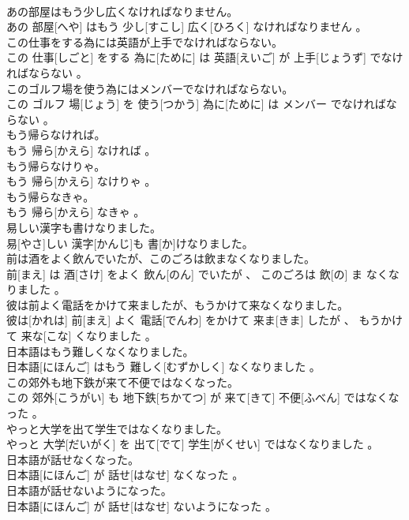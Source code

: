 \documentclass[8pt]{extreport}
\begin{document}
\begin{CJK}{UTF8}{min}
\\	あの部屋はもう少し広くなければなりません。	
\\	あの 部屋[へや] はもう 少し[すこし] 広く[ひろく] なければなりません 。
\\	この仕事をする為には英語が上手でなければならない。	
\\	この 仕事[しごと] をする 為に[ために] は 英語[えいご] が 上手[じょうず] でなければならない 。
\\	このゴルフ場を使う為にはメンバーでなければならない。	
\\	この ゴルフ 場[じょう] を 使う[つかう] 為に[ために] は メンバー でなければならない 。
\\	もう帰らなければ。	
\\	もう 帰ら[かえら] なければ 。
\\	もう帰らなけりゃ。	
\\	もう 帰ら[かえら] なけりゃ 。
\\	もう帰らなきゃ。	
\\	もう 帰ら[かえら] なきゃ 。
\\	易しい漢字も書けなりました。	
\\	易[やさ]しい 漢字[かんじ]も 書[か]けなりました。
\\	前は酒をよく飲んでいたが、このごろは飲まなくなりました。	
\\	前[まえ] は 酒[さけ] をよく 飲ん[のん] でいたが 、 このごろは 飲[の] ま なくなりました 。
\\	彼は前よく電話をかけて来ましたが、もうかけて来なくなりました。	
\\	彼は[かれは] 前[まえ] よく 電話[でんわ] をかけて 来ま[きま] したが 、 もうかけて 来な[こな] くなりました 。
\\	日本語はもう難しくなくなりました。	
\\	日本語[にほんご] はもう 難しく[むずかしく] なくなりました 。
\\	この郊外も地下鉄が来て不便ではなくなった。	
\\	この 郊外[こうがい] も 地下鉄[ちかてつ] が 来て[きて] 不便[ふべん] ではなくなった 。
\\	やっと大学を出て学生ではなくなりました。	
\\	やっと 大学[だいがく] を 出て[でて] 学生[がくせい] ではなくなりました 。
\\	日本語が話せなくなった。	
\\	日本語[にほんご] が 話せ[はなせ] なくなった 。
\\	日本語が話せないようになった。	
\\	日本語[にほんご] が 話せ[はなせ] ないようになった 。

\end{CJK}
\end{document}
